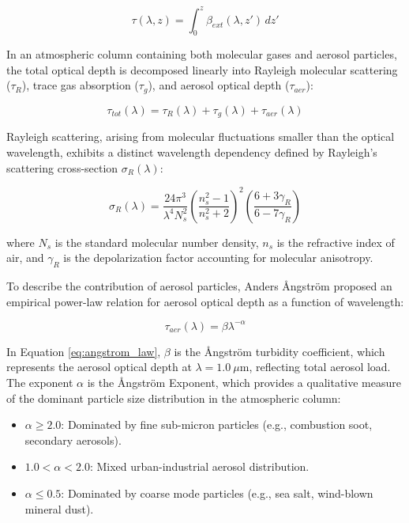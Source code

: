 \documentclass[12pt,a4paper]{article}
\begin{document}
\begin{equation}
\tau(\lambda, z) = \int_{0}^{z} \beta_{ext}(\lambda, z') \, dz'
\end{equation}

In an atmospheric column containing both molecular gases and aerosol particles, the total optical depth is decomposed linearly into Rayleigh molecular scattering ($\tau_R$), trace gas absorption ($\tau_g$), and aerosol optical depth ($\tau_{aer}$):

\begin{equation}
\tau_{tot}(\lambda) = \tau_R(\lambda) + \tau_g(\lambda) + \tau_{aer}(\lambda)
\end{equation}

Rayleigh scattering, arising from molecular fluctuations smaller than the optical wavelength, exhibits a distinct wavelength dependency defined by Rayleigh's scattering cross-section $\sigma_R(\lambda)$:

\begin{equation}
\sigma_R(\lambda) = \frac{24 \pi^3}{\lambda^4 N_s^2} \left( \frac{n_s^2 - 1}{n_s^2 + 2} \right)^2 \left( \frac{6 + 3\gamma_R}{6 - 7\gamma_R} \right)
\end{equation}

where $N_s$ is the standard molecular number density, $n_s$ is the refractive index of air, and $\gamma_R$ is the depolarization factor accounting for molecular anisotropy.

To describe the contribution of aerosol particles, Anders Ångström proposed an empirical power-law relation for aerosol optical depth as a function of wavelength:

\begin{equation}
\tau_{aer}(\lambda) = \beta \lambda^{-\alpha}
\label{eq:angstrom_law}
\end{equation}

In Equation \ref{eq:angstrom_law}, $\beta$ is the Ångström turbidity coefficient, which represents the aerosol optical depth at $\lambda = 1.0~\mu\text{m}$, reflecting total aerosol load. The exponent $\alpha$ is the Ångström Exponent, which provides a qualitative measure of the dominant particle size distribution in the atmospheric column:
\begin{itemize}
    \item $\alpha \ge 2.0$: Dominated by fine sub-micron particles (e.g., combustion soot, secondary aerosols).
    \item $1.0 < \alpha < 2.0$: Mixed urban-industrial aerosol distribution.
    \item $\alpha \le 0.5$: Dominated by coarse mode particles (e.g., sea salt, wind-blown mineral dust).
\end{itemize}
\end{document}
